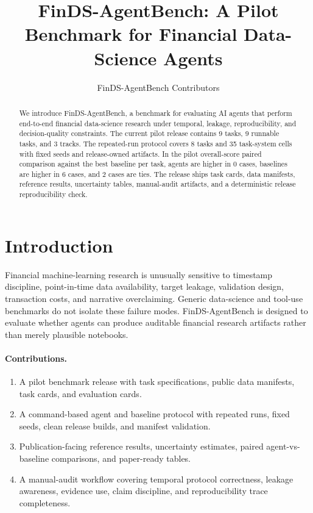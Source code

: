 \documentclass[11pt]{article}
\title{FinDS-AgentBench: A Pilot Benchmark for Financial Data-Science Agents}
\author{FinDS-AgentBench Contributors}
\date{}
\begin{document}
\maketitle

\begin{abstract}
We introduce FinDS-AgentBench, a benchmark for evaluating AI agents that perform end-to-end financial data-science research under temporal, leakage, reproducibility, and decision-quality constraints. The current pilot release contains 9 tasks, 9 runnable tasks, and 3 tracks. The repeated-run protocol covers 8 tasks and 35 task-system cells with fixed seeds and release-owned artifacts. In the pilot overall-score paired comparison against the best baseline per task, agents are higher in 0 cases, baselines are higher in 6 cases, and 2 cases are ties. The release ships task cards, data manifests, reference results, uncertainty tables, manual-audit artifacts, and a deterministic release reproducibility check.
\end{abstract}

\section{Introduction}
Financial machine-learning research is unusually sensitive to timestamp discipline, point-in-time data availability, target leakage, validation design, transaction costs, and narrative overclaiming. Generic data-science and tool-use benchmarks do not isolate these failure modes. FinDS-AgentBench is designed to evaluate whether agents can produce auditable financial research artifacts rather than merely plausible notebooks.

\paragraph{Contributions.}
\begin{enumerate}[leftmargin=*]
\item A pilot benchmark release with task specifications, public data manifests, task cards, and evaluation cards.
\item A command-based agent and baseline protocol with repeated runs, fixed seeds, clean release builds, and manifest validation.
\item Publication-facing reference results, uncertainty estimates, paired agent-vs-baseline comparisons, and paper-ready tables.
\item A manual-audit workflow covering temporal protocol correctness, leakage awareness, evidence use, claim discipline, and reproducibility trace completeness.
\end{enumerate}
\end{document}
